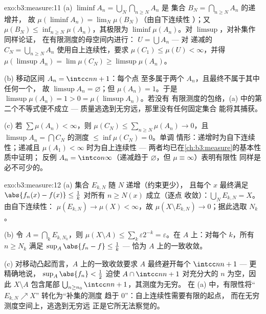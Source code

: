 \begin{solution}{exo:b3:measure:11}
(a) $\liminf A_n = \bigcup_N\bigcap_{n\geq N}A_n$ 是
集合 $B_N = \bigcap_{n\geq N}A_n$ 的递增并，
故 $\mu(\liminf A_n) = \lim_N\mu(B_N)$（由自下连续性
）；又 $\mu(B_N) \leq \inf_{n \geq N}\mu(A_n)$，其极限为
$\liminf\mu(A_n)$。对 $\limsup$，对补集作同样论证，
在有限测度的母空间内进行：
$U = \bigcup A_n$ --- 对
递减的 $C_N = \bigcup_{n\geq N}A_n$ 使用自上连续性，要求 $\mu(C_1)
\leq \mu(U) < \infty$，并得 $\mu(\limsup A_n) =
\lim\mu(C_N) \geq \limsup\mu(A_n)$。

(b) 移动区间 $A_n = \intcc n{n+1}$：每个点
至多属于两个 $A_n$，且最终不属于其中任何一个，
故 $\limsup A_n = \varnothing$；但 $\mu(A_n) = 1$。于是
$\limsup\mu(A_n) = 1 > 0 = \mu(\limsup A_n)$。若没有
有限测度的包络，(a) 中的第二个不等式便不成立
--- 质量逃逸到无穷远，那里没有任何固定集合
能将其捕获。

(c) 若 $\sum\mu(A_n) < \infty$，则 $\mu(C_N) \leq
\sum_{n\geq N}\mu(A_n) \to 0$，且 $\limsup A_n =
\bigcap C_N$ 的测度 $\leq \inf\mu(C_N) = 0$。单调
情形：递增时为自下连续性；递减且
$\mu(A_1) < \infty$ 时为自上连续性 ---
两者均已在\cref{ch:b3:measure}的基本性质中证明；
反例 $A_n = \intco n\infty$（递减趋于
$\varnothing$，但 $\mu \equiv \infty$）表明有限性
同样是必不可少的。
\end{solution}

\begin{solution}{exo:b3:measure:12}
(a) 集合 $E_{k,N}$ 随 $N$ 递增（约束更少），
且每个 $x$ 最终满足 $\abs{f_n(x)
- f(x)} \leq \frac1k$ 对所有 $n \geq N(x)$ 成立（逐点
收敛）：$\bigcup_NE_{k,N} = X$。由自下连续性：
$\mu(E_{k,N}) \to \mu(X) < \infty$，故 $\mu(X\setminus
E_{k,N}) \to 0$；据此选取 $N_k$。

(b) 令 $A = \bigcap_kE_{k,N_k}$，则 $\mu(X\setminus A) \leq
\sum_k\varepsilon2^{-k} = \varepsilon$。在 $A$ 上：对每个
$k$，所有 $n \geq N_k$ 满足 $\sup_A\abs{f_n - f} \leq
\frac1k$ --- 恰为 $A$ 上的一致收敛。

(c) 对移动凸起而言，$A$ 上的一致收敛要求
$A$ 最终避开每个 $\intcc n{n+1}$ --- 更精确地说，
$\sup_A\abs{f_n} < \frac12$ 迫使 $A \cap \intcc
n{n+1}$ 对充分大的 $n$ 为空，因此 $X \setminus A$
包含尾部 $\bigcup_{n\geq n_0}\intcc n{n+1}$，其测度为无穷。
在 (a) 中，有限性将“$E_{k,N}\nearrow X$”
转化为“补集的测度
趋于 $0$”：自上连续性需要有限的起点，
而在无穷测度空间上，逃逸到无穷远
正是它所无法察觉的。
\end{solution}

